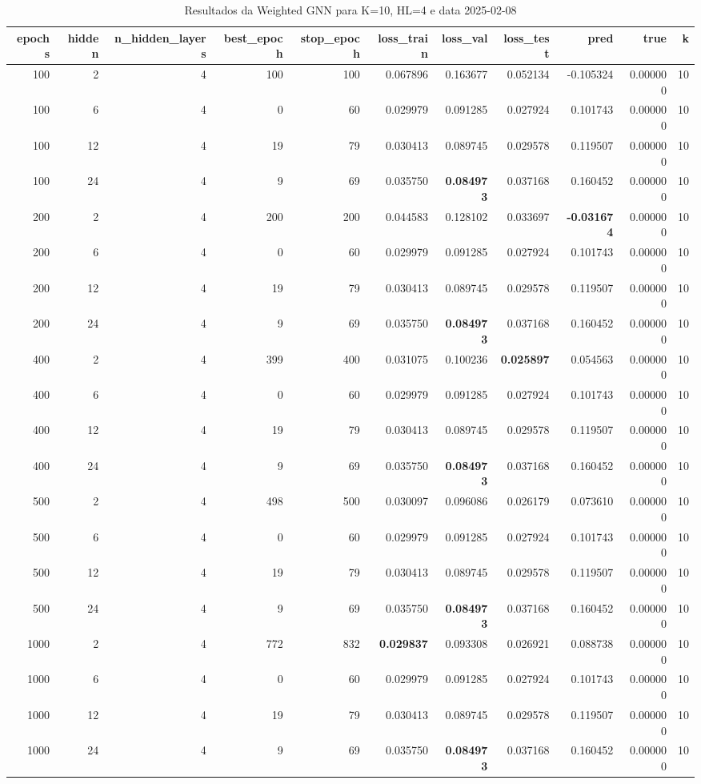 \begin{table}
\caption{Resultados da Weighted GNN para K=10, HL=4 e data 2025-02-08}
\label{tab:weighted_gnn_results_k10_hl4_d20250208}
\begin{tabular}{rrrrrrrrrrr}
\toprule
epochs & hidden & n\_hidden\_layers & best\_epoch & stop\_epoch & loss\_train & loss\_val & loss\_test & pred & true & k \\
\midrule
100 & 2 & 4 & 100 & 100 & 0.067896 & 0.163677 & 0.052134 & -0.105324 & 0.000000 & 10 \\
100 & 6 & 4 & 0 & 60 & 0.029979 & 0.091285 & 0.027924 & 0.101743 & 0.000000 & 10 \\
100 & 12 & 4 & 19 & 79 & 0.030413 & 0.089745 & 0.029578 & 0.119507 & 0.000000 & 10 \\
100 & 24 & 4 & 9 & 69 & 0.035750 & \textbf{0.084973} & 0.037168 & 0.160452 & 0.000000 & 10 \\
200 & 2 & 4 & 200 & 200 & 0.044583 & 0.128102 & 0.033697 & \textbf{-0.031674} & 0.000000 & 10 \\
200 & 6 & 4 & 0 & 60 & 0.029979 & 0.091285 & 0.027924 & 0.101743 & 0.000000 & 10 \\
200 & 12 & 4 & 19 & 79 & 0.030413 & 0.089745 & 0.029578 & 0.119507 & 0.000000 & 10 \\
200 & 24 & 4 & 9 & 69 & 0.035750 & \textbf{0.084973} & 0.037168 & 0.160452 & 0.000000 & 10 \\
400 & 2 & 4 & 399 & 400 & 0.031075 & 0.100236 & \textbf{0.025897} & 0.054563 & 0.000000 & 10 \\
400 & 6 & 4 & 0 & 60 & 0.029979 & 0.091285 & 0.027924 & 0.101743 & 0.000000 & 10 \\
400 & 12 & 4 & 19 & 79 & 0.030413 & 0.089745 & 0.029578 & 0.119507 & 0.000000 & 10 \\
400 & 24 & 4 & 9 & 69 & 0.035750 & \textbf{0.084973} & 0.037168 & 0.160452 & 0.000000 & 10 \\
500 & 2 & 4 & 498 & 500 & 0.030097 & 0.096086 & 0.026179 & 0.073610 & 0.000000 & 10 \\
500 & 6 & 4 & 0 & 60 & 0.029979 & 0.091285 & 0.027924 & 0.101743 & 0.000000 & 10 \\
500 & 12 & 4 & 19 & 79 & 0.030413 & 0.089745 & 0.029578 & 0.119507 & 0.000000 & 10 \\
500 & 24 & 4 & 9 & 69 & 0.035750 & \textbf{0.084973} & 0.037168 & 0.160452 & 0.000000 & 10 \\
1000 & 2 & 4 & 772 & 832 & \textbf{0.029837} & 0.093308 & 0.026921 & 0.088738 & 0.000000 & 10 \\
1000 & 6 & 4 & 0 & 60 & 0.029979 & 0.091285 & 0.027924 & 0.101743 & 0.000000 & 10 \\
1000 & 12 & 4 & 19 & 79 & 0.030413 & 0.089745 & 0.029578 & 0.119507 & 0.000000 & 10 \\
1000 & 24 & 4 & 9 & 69 & 0.035750 & \textbf{0.084973} & 0.037168 & 0.160452 & 0.000000 & 10 \\
\bottomrule
\end{tabular}
\end{table}

